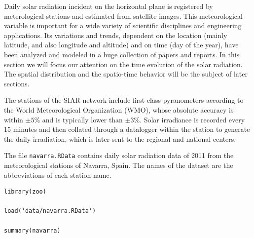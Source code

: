 
Daily solar radiation incident on the horizontal plane is registered
by meterological stations and estimated from satellite images. This
meteorological variable is important for a wide variety of scientific
disciplines and engineering applications. Its variations and trends,
dependent on the location (mainly latitude, and also longitude and
altitude) and on time (day of the year), have been analyzed and
modeled in a huge collection of papers and reports. In this section
we will focus our attention on the time evolution of the solar
radiation. The spatial distribution and the spatio-time behavior will
be the subject of later sections.

The stations of the SIAR network include first-class pyranometers
according to the World Meteorological Organization (WMO), whose
absolute accuracy is within \(\pm 5\%\) and is typically lower than \(\pm
3\%\). Solar irradiance is recorded every 15 minutes and then
collated through a datalogger within the station to generate the daily
irradiation, which is later sent to the regional and national centers.

The file \texttt{navarra.RData} contains daily solar radiation data of 2011
from the meteorological stations of Navarra, Spain. The names of the
dataset are the abbreviations of each station name.

\lstset{language=r,label= ,caption= ,captionpos=b,numbers=none}
\begin{lstlisting}
library(zoo)

load('data/navarra.RData')

summary(navarra)
\end{lstlisting}

